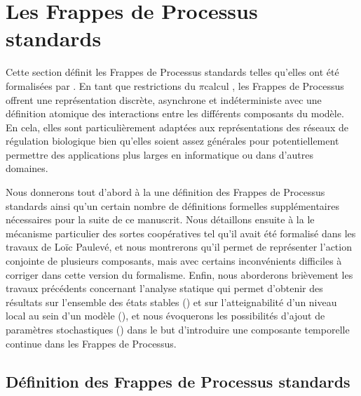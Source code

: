 \section{Les Frappes de Processus standards}

Cette section définit les Frappes de Processus standards
telles qu'elles ont été formalisées par .
En tant que restrictions du $\pi$\nbd calcul \cite{Brand83,Milner89},
les Frappes de Processus offrent une représentation discrète, asynchrone et indéterministe
avec une définition atomique des interactions entre les différents composants du modèle.
En cela,
elles sont particulièrement adaptées aux représentations des réseaux de régulation biologique
bien qu'elles soient assez générales pour potentiellement permettre des applications plus
larges en informatique ou dans d'autres domaines.

Nous donnerons tout d'abord à la  une définition des Frappes de Processus standards
ainsi qu'un certain nombre de définitions formelles supplémentaires
nécessaires pour la suite de ce manuscrit.
Nous détaillons ensuite à la  le mécanisme particulier des sortes coopératives
tel qu'il avait été formalisé dans les travaux de Loïc Paulevé,
et nous montrerons qu'il permet de représenter l'action conjointe de plusieurs composants,
mais avec certains inconvénients difficiles à corriger dans cette version du formalisme.
Enfin, nous aborderons brièvement les travaux précédents
concernant l'analyse statique qui permet d'obtenir des résultats
sur l'ensemble des états stables ()
et sur l'atteignabilité d'un niveau local au sein d'un modèle (),
et nous évoquerons les possibilités d'ajout de paramètres stochastiques ()
dans le but d'introduire une composante temporelle continue dans les Frappes de Processus.



\subsection{Définition des Frappes de Processus standards}

